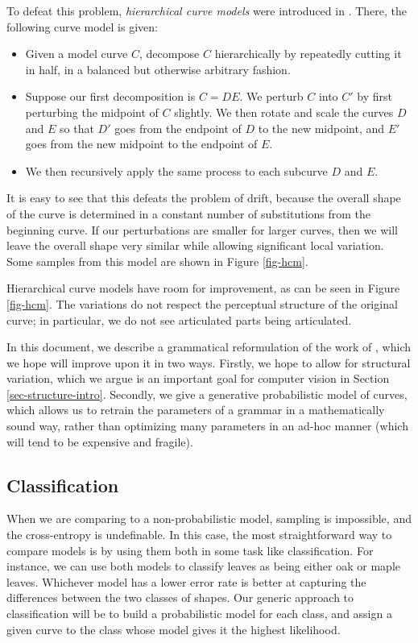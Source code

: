 To defeat this problem, \emph{hierarchical curve models} were
introduced in \cite{hcm}. There, the following curve model is given:
\begin{itemize}
\item Given a model curve $C$, decompose $C$ hierarchically by
  repeatedly cutting it in half, in a balanced but otherwise arbitrary
  fashion.
\item Suppose our first decomposition is $C=DE$. We perturb $C$ into
  $C'$ by first perturbing the midpoint of $C$ slightly. We then
  rotate and scale the curves $D$ and $E$ so that $D'$ goes from the
  endpoint of $D$ to the new midpoint, and $E'$ goes from the new
  midpoint to the endpoint of $E$.
\item We then recursively apply the same process to each subcurve $D$
  and $E$. 
\end{itemize}
It is easy to see that this defeats the problem of drift, because the
overall shape of the curve is determined in a constant number of
substitutions from the beginning curve. If our perturbations are
smaller for larger curves, then we will leave the overall shape very
similar while allowing significant local variation. Some samples from
this model are shown in Figure \ref{fig-hcm}.

Hierarchical curve models have room for improvement, as can be seen in
Figure \ref{fig-hcm}. The variations do not respect the perceptual
structure of the original curve; in particular, we do not see
articulated parts being articulated.

In this document, we describe a grammatical reformulation of the work
of \cite{hcm}, which we hope will improve upon it in two
ways. Firstly, we hope to allow for structural variation, which we
argue is an important goal for computer vision in Section
\ref{sec-structure-intro}. Secondly, we give a generative probabilistic
model of curves, which allows us to retrain the parameters of a
grammar in a mathematically sound way, rather than optimizing many
parameters in an ad-hoc manner (which will tend to be expensive and
fragile).

\subsection{Classification}

When we are comparing to a non-probabilistic model, sampling is
impossible, and the cross-entropy is undefinable. In this case, the
most straightforward way to compare models is by using them both in
some task like classification. For instance, we can use both models to
classify leaves as being either oak or maple leaves. Whichever model
has a lower error rate is better at capturing the differences between
the two classes of shapes.  Our generic approach to classification
will be to build a probabilistic model for each class, and assign a
given curve to the class whose model gives it the highest likelihood.

